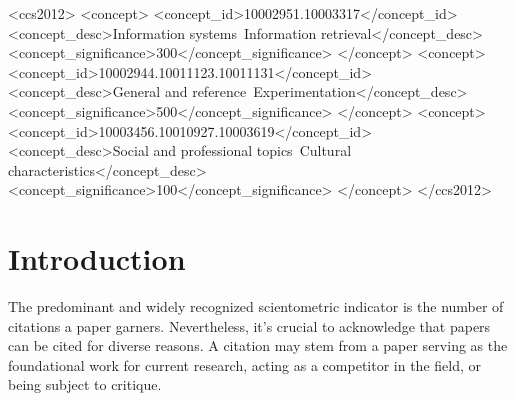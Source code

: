 \documentclass[sigconf]{acmart}
\begin{document}
\begin{CCSXML}
    <ccs2012>
       <concept>
           <concept_id>10002951.10003317</concept_id>
           <concept_desc>Information systems~Information retrieval</concept_desc>
           <concept_significance>300</concept_significance>
           </concept>
       <concept>
           <concept_id>10002944.10011123.10011131</concept_id>
           <concept_desc>General and reference~Experimentation</concept_desc>
           <concept_significance>500</concept_significance>
           </concept>
       <concept>
           <concept_id>10003456.10010927.10003619</concept_id>
           <concept_desc>Social and professional topics~Cultural characteristics</concept_desc>
           <concept_significance>100</concept_significance>
           </concept>
     </ccs2012>
\end{CCSXML}
    



\maketitle

\section{Introduction}
The predominant and widely recognized scientometric indicator is the number 
of citations a paper garners. Nevertheless, it's crucial to acknowledge that 
papers can be cited for diverse reasons. A citation may stem from a paper 
serving as the foundational work for current research, acting as a competitor 
in the field, or being subject to critique. 
\end{document}
